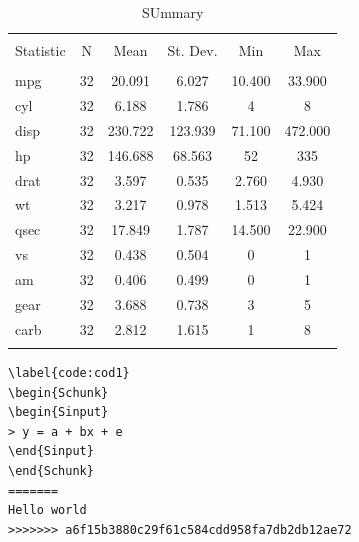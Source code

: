 \documentclass{article}
\begin{document}
\begin{table}[!htbp] \centering 
  \caption{SUmmary} 
  \label{tab:tabella} 
\begin{tabular}{@{\extracolsep{5pt}}lccccc} 
\\[-1.8ex]\hline 
\hline \\[-1.8ex] 
Statistic & \multicolumn{1}{c}{N} & \multicolumn{1}{c}{Mean} & \multicolumn{1}{c}{St. Dev.} & \multicolumn{1}{c}{Min} & \multicolumn{1}{c}{Max} \\ 
\hline \\[-1.8ex] 
mpg & 32 & 20.091 & 6.027 & 10.400 & 33.900 \\ 
cyl & 32 & 6.188 & 1.786 & 4 & 8 \\ 
disp & 32 & 230.722 & 123.939 & 71.100 & 472.000 \\ 
hp & 32 & 146.688 & 68.563 & 52 & 335 \\ 
drat & 32 & 3.597 & 0.535 & 2.760 & 4.930 \\ 
wt & 32 & 3.217 & 0.978 & 1.513 & 5.424 \\ 
qsec & 32 & 17.849 & 1.787 & 14.500 & 22.900 \\ 
vs & 32 & 0.438 & 0.504 & 0 & 1 \\ 
am & 32 & 0.406 & 0.499 & 0 & 1 \\ 
gear & 32 & 3.688 & 0.738 & 3 & 5 \\ 
carb & 32 & 2.812 & 1.615 & 1 & 8 \\ 
\hline \\[-1.8ex] 
\end{tabular} 
\end{table} 
\begin{verbatim}\label{code:cod1}
\begin{Schunk}
\begin{Sinput}
> y = a + bx + e
\end{Sinput}
\end{Schunk}
=======
Hello world
>>>>>>> a6f15b3880c29f61c584cdd958fa7db2db12ae72

\end{verbatim}
\end{document}
